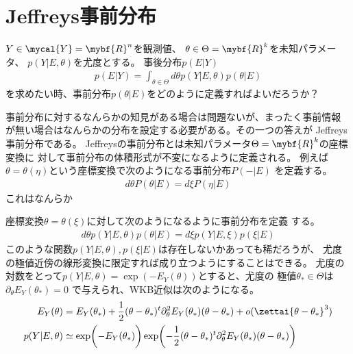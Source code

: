 \section{Jeffreys事前分布}\label{s1:Jeffreys事前分布} %
	$Y\in\mycal{Y}=\mybf{R}^n$を観測値、
	$\theta\in\Theta=\mybf{R}^k$を未知パラメータ、
	$p(Y|E,\theta)$を尤度とする。
	事後分布$p(E|Y)$
	\begin{equation*}\begin{split} %
		p(E|Y)=\int_{\theta\in\Theta}d\theta p(Y|E,\theta)p(\theta|E)
	\end{split}\end{equation*} %
	を求めたい時、事前分布$p(\theta|E)$をどのように定義すればよいだろうか？

	事前分布に対するなんらかの知見がある場合は問題ないが、まったく事前情報
	が無い場合はなんらかの分布を設定する必要がある。その一つの答えが
	Jeffreys事前分布である。
	Jeffreysの事前分布とは未知パラメータ$\Theta=\mybf{R}^k$の座標変換に
	対して事前分布の体積形式が不変になるように定義される。
	例えば$\theta=\theta(\eta)$という座標変換で次のようになる事前分布$P(-|E)$
	を定義する。
	\begin{equation*}\begin{split} %
		d\theta P(\theta|E) = d\xi P(\eta|E)
	\end{split}\end{equation*} %
	これはなんらか

	座標変換$\theta=\theta(\xi)$に対して次のようになるように事前分布を定義
	する。
	\begin{equation*}\begin{split} %
		d\theta p(Y|E,\theta)p(\theta|E) = d\xi p(Y|E,\xi)p(\xi|E)
	\end{split}\end{equation*} %
	このような関数$p(Y|E,\theta),p(\xi|E)$は存在しないかあっても稀だろうが、
	尤度の極値近傍の線形変換に限定すれば成り立つようにすることはできる。
	尤度の対数をとって$p(Y|E,\theta)=\exp(-E_Y(\theta))$とすると、尤度の
	極値$\theta_*\in\Theta$は$\partial_\theta E_Y(\theta_*)=0$
	で与えられ、WKB近似は次のようになる。
	\begin{equation*}\begin{split} %
		E_Y(\theta) &= E_Y(\theta_*) + \frac{1}{2}(\theta-\theta_*)^t
			\partial_\theta^2E_Y(\theta_*)(\theta-\theta_*)
			+ o(\zettai{\theta-\theta_*}^3) \\
		p(Y|E,\theta) &\simeq \exp\biggl(-E_Y(\theta_*)\biggr) 
			\exp\biggl(-\frac{1}{2}(\theta-\theta_*)^t
			\partial_\theta^2E_Y(\theta_*)(\theta-\theta_*)\biggr) \\
	\end{split}\end{equation*} %

